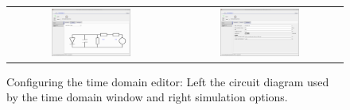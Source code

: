 \newpage
\begin{figure}
\centering
\begin{tabular}{ c c }

\includegraphics[width=0.5\textwidth,height=0.4\textwidth]{./images/time_domain_editor1.png}

&
\includegraphics[width=0.5\textwidth,height=0.4\textwidth]{./images/time_domain_editor4.png}

\end{tabular}
\caption{Configuring the time domain editor: Left the circuit diagram used by the time domain window and right simulation options.}
\label{fig:timedomaineditor2}
\end{figure}

\vspace*{\fill}
